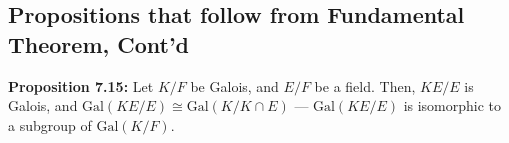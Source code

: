 \documentclass[10pt]{extarticle}
\begin{document}
  \subsection{Propositions that follow from Fundamental Theorem, Cont'd}%
  \textbf{Proposition 7.15:} Let $K/F$ be Galois, and $E/F$ be a field. Then, $KE/E$ is Galois, and $\text{Gal}(KE/E) \cong \text{Gal}(K/K\cap E)$ --- $\text{Gal}(KE/E)$ is isomorphic to a subgroup of $\text{Gal}(K/F)$.
  \begin{center}
  \end{center}
\end{document}
